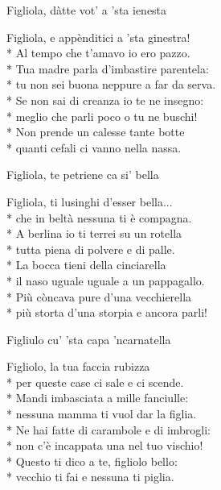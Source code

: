 \documentclass[11pt]{book}
\begin{document}
\begin{poem}{Figliola, dàtte vot’ a ’sta ienesta}{}
\settowidth{\versewidth}{Figliola, e appènditici a ’sta ginestra}
\begin{altverse}
Figliola, e appènditici a ’sta ginestra!\\*
Al tempo che t’amavo io ero pazzo.\\*
Tua madre parla d’imbastire parentela:\\*
tu non sei buona neppure a far da serva.\\*
Se non sai di creanza io te ne insegno:\\*
meglio che parli poco o tu ne buschi!\\*
Non prende un calesse tante botte\\*
quanti cefali ci vanno nella nassa.
\end{altverse}
\end{poem}

\begin{poem}{Figliola, te petriene ca si’ bella}{}
\settowidth{\versewidth}{Più storta d’una storpia e ancora parli}
\begin{altverse}
Figliola, ti lusinghi d’esser bella...\\*
che in beltà nessuna ti è compagna.\\*
A berlina io ti terrei su un rotella\\*
tutta piena di polvere e di palle.\\*
La bocca tieni della cinciarella\\*
il naso uguale uguale a un pappagallo.\\*
Più còncava pure d’una vecchierella\\*
più storta d’una storpia e ancora parli!
\end{altverse}
\end{poem}

\begin{poem}{Figliulo cu’ ’sta capa ’ncarnatella}{}
\settowidth{\versewidth}{Ne hai fatte di carambole e di imbrogli}
\begin{altverse}
Figliolo, la tua faccia rubizza\\*
per queste case ci sale e ci scende.\\*
Mandi imbasciata a mille fanciulle:\\*
nessuna mamma ti vuol dar la figlia.\\*
Ne hai fatte di carambole e di imbrogli:\\*
non c’è incappata una nel tuo vischio!\\*
Questo ti dico a te, figliolo bello:\\*
vecchio ti fai e nessuna ti piglia.
\end{altverse}
\end{poem}
\end{document}
